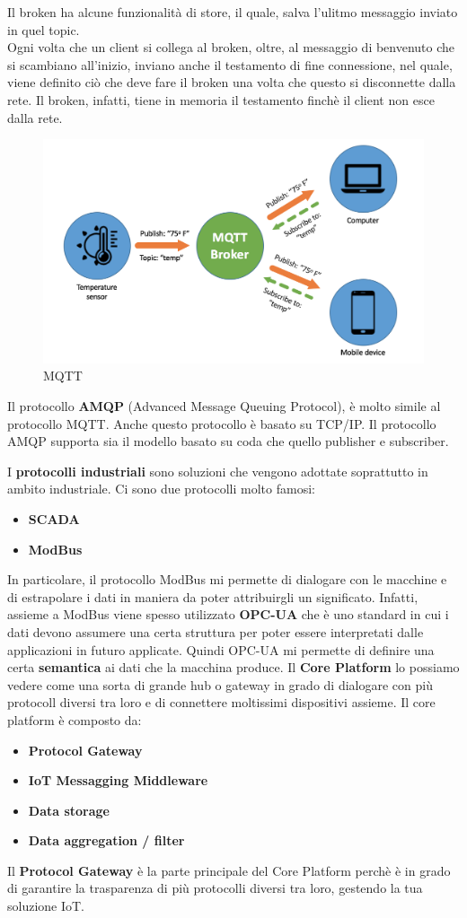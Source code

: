 \documentclass[10pt,a4paper,oneside]{scrbook}
\begin{document}
Il broken ha alcune funzionalità di store, il quale, salva l'ulitmo messaggio inviato in quel topic.\\
Ogni volta che un client si collega al broken, oltre, al messaggio di benvenuto che si scambiano all'inizio, inviano anche il testamento di fine connessione, nel quale, viene definito ciò che deve fare il broken una volta che questo si disconnette dalla rete. Il broken, infatti, tiene in memoria il testamento finchè il client non esce dalla rete.
\begin{figure}[h]
    \centering
    \includegraphics[width=0.6\linewidth]{img/MQTT.png}
    \caption{MQTT}
    \label{fig:MQTT}
\end{figure}


Il protocollo \textbf{AMQP} (Advanced Message Queuing Protocol), è molto simile al protocollo MQTT. Anche questo protocollo è basato su TCP/IP. Il protocollo AMQP supporta sia il modello basato su coda che quello publisher e subscriber.

I \textbf{protocolli industriali} sono soluzioni che vengono adottate soprattutto in ambito industriale.
Ci sono due protocolli molto famosi:
\begin{itemize}
    \item \textbf{SCADA}
    \item \textbf{ModBus}
\end{itemize}
In particolare, il protocollo ModBus mi permette di dialogare con le macchine e di estrapolare i dati in maniera da poter attribuirgli un significato. Infatti, assieme a ModBus viene spesso utilizzato \textbf{OPC-UA} che è uno standard in cui i dati devono assumere una certa struttura per poter essere interpretati dalle applicazioni in futuro applicate. Quindi OPC-UA mi permette di definire una certa \textbf{semantica} ai dati che la macchina produce. 
Il \textbf{Core Platform} lo possiamo vedere come una sorta di grande hub o gateway in grado di dialogare con più protocoll diversi tra loro e di connettere moltissimi dispositivi assieme.
Il core platform è composto da:
\begin{itemize}
    \item \textbf{Protocol Gateway}
    \item \textbf{IoT Messagging Middleware}
    \item \textbf{Data storage}
    \item  \textbf{Data aggregation / filter}
\end{itemize}
Il \textbf{Protocol Gateway} è la parte principale del Core Platform perchè è in grado di garantire la trasparenza di più protocolli diversi tra loro, gestendo la tua soluzione IoT.
\end{document}
